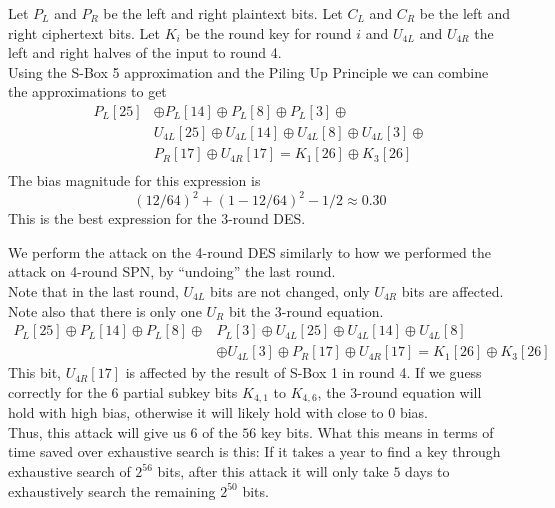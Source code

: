 \documentclass[9pt]{beamer}
\begin{document}
\begin{frame}
Let $P_L$ and $P_R$ be the left and right plaintext bits. Let $C_L$ and $C_R$ be the left and right ciphertext bits. Let $K_i$ be the round key for round $i$ and $U_{4L}$ and $U_{4R}$ the left and right halves of the input to round 4.\\
\vspace{5mm}
Using the S-Box 5 approximation and the Piling Up Principle we can combine the approximations to get
\begin{align*}
 P_L[25] & \oplus P_L[14] \oplus P_L[8] \oplus P_L[3] \oplus \\
         & U_{4L}[25] \oplus U_{4L}[14] \oplus U_{4L}[8] \oplus U_{4L}[3] \oplus \\
			& P_R[17] \oplus U_{4R}[17] = K_1[26] \oplus K_3[26] \\
\end{align*}
The bias magnitude for this expression is
\[ (12/64)^2 + (1 - 12/64)^2 - 1/2 \approx 0.30 \]
This is the best expression for the 3-round DES.
\end{frame}

\begin{frame}
We perform the attack on the 4-round DES similarly to how we performed the attack on 4-round SPN, by ``undoing'' the last round.\\
\vspace{5mm}
\pause
Note that in the last round, $U_{4L}$ bits are not changed, only $U_{4R}$ bits are affected. Note also that there is only one $U_R$ bit the 3-round equation.
\begin{align*} 
P_L[25] \oplus P_L[14] \oplus P_L[8] \oplus & P_L[3] \oplus U_{4L}[25] \oplus U_{4L}[14] \oplus U_{4L}[8] \\ & \oplus U_{4L}[3] \oplus P_R[17] \oplus U_{4R}[17] = K_1[26] \oplus K_3[26]
\end{align*}
\vspace{5mm}
\pause
This bit, $U_{4R}[17]$ is affected by the result of S-Box 1 in round 4. If we guess correctly for the 6 partial subkey bits $K_{4,1}$ to $K_{4,6}$, the 3-round equation will hold with high bias, otherwise it will likely hold with close to 0 bias.\\
\vspace{5mm}
\pause
Thus, this attack will give us $6$ of the $56$ key bits. What this means in terms of time saved over exhaustive search is this: If it takes a year to find a key through exhaustive search of $2^{56}$ bits, after this attack it will only take $5$ days to exhaustively search the remaining $2^{50}$ bits.
\end{frame}
\end{document}
